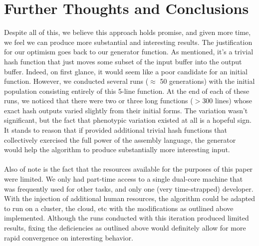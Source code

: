 \documentclass{article}
\begin{document}
\section{Further Thoughts and Conclusions}
Despite all of this, we believe this approach holds promise, and given more time, we feel we can produce more substantial and interesting results. The justification for our optimism goes back to our generator function. As mentioned, it's a trivial hash function that just moves some subset of the input buffer into the output buffer. Indeed, on first glance, it would seem like a poor candidate for an initial function. However, we conducted several runs ($\approx$ 50 generations) with the initial population consisting entirely of this 5-line function. At the end of each of these runs, we noticed that there were two or three long functions ($>$300 lines) whose exact hash outputs varied slightly from their initial forms. The variation wasn't significant, but the fact that phenotypic variation existed at all is a hopeful sign. It stands to reason that if provided additional trivial hash functions that collectively exercised the full power of the assembly language, the generator would help the algorithm to produce substantially more interesting input.

\paragraph{}
Also of note is the fact that the resources available for the purposes of this paper were limited. We only had part-time access to a single dual-core machine that was frequently used for other tasks, and only one (very time-strapped) developer.  With the injection of additional human resources, the algorithm could be adapted to run on a cluster, the cloud, etc with the modifications as outlined above implemented. Although the runs conducted with this iteration produced limited results, fixing the deficiencies as outlined above would definitely allow for more rapid convergence on interesting behavior.

\newpage

\end{document}

